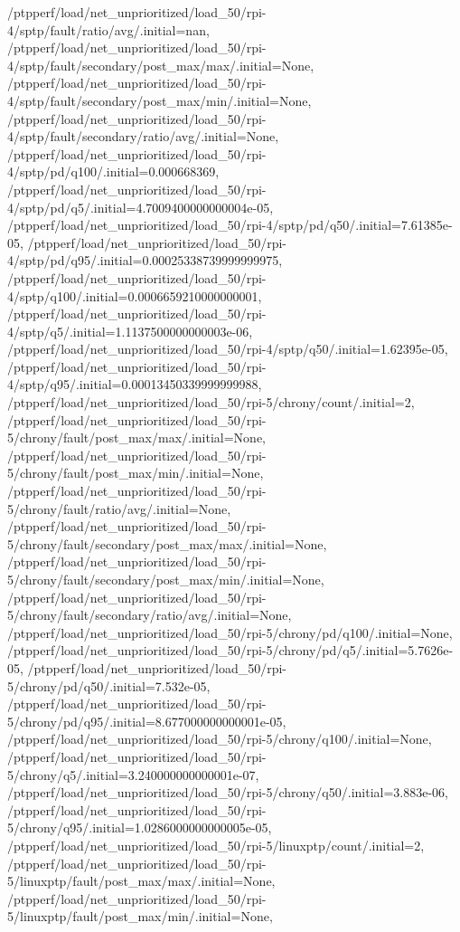 {    /ptpperf/load/net_unprioritized/load_50/rpi-4/sptp/fault/ratio/avg/.initial=nan,
    /ptpperf/load/net_unprioritized/load_50/rpi-4/sptp/fault/secondary/post_max/max/.initial=None,
    /ptpperf/load/net_unprioritized/load_50/rpi-4/sptp/fault/secondary/post_max/min/.initial=None,
    /ptpperf/load/net_unprioritized/load_50/rpi-4/sptp/fault/secondary/ratio/avg/.initial=None,
    /ptpperf/load/net_unprioritized/load_50/rpi-4/sptp/pd/q100/.initial=0.000668369,
    /ptpperf/load/net_unprioritized/load_50/rpi-4/sptp/pd/q5/.initial=4.7009400000000004e-05,
    /ptpperf/load/net_unprioritized/load_50/rpi-4/sptp/pd/q50/.initial=7.61385e-05,
    /ptpperf/load/net_unprioritized/load_50/rpi-4/sptp/pd/q95/.initial=0.00025338739999999975,
    /ptpperf/load/net_unprioritized/load_50/rpi-4/sptp/q100/.initial=0.0006659210000000001,
    /ptpperf/load/net_unprioritized/load_50/rpi-4/sptp/q5/.initial=1.1137500000000003e-06,
    /ptpperf/load/net_unprioritized/load_50/rpi-4/sptp/q50/.initial=1.62395e-05,
    /ptpperf/load/net_unprioritized/load_50/rpi-4/sptp/q95/.initial=0.00013450339999999988,
    /ptpperf/load/net_unprioritized/load_50/rpi-5/chrony/count/.initial=2,
    /ptpperf/load/net_unprioritized/load_50/rpi-5/chrony/fault/post_max/max/.initial=None,
    /ptpperf/load/net_unprioritized/load_50/rpi-5/chrony/fault/post_max/min/.initial=None,
    /ptpperf/load/net_unprioritized/load_50/rpi-5/chrony/fault/ratio/avg/.initial=None,
    /ptpperf/load/net_unprioritized/load_50/rpi-5/chrony/fault/secondary/post_max/max/.initial=None,
    /ptpperf/load/net_unprioritized/load_50/rpi-5/chrony/fault/secondary/post_max/min/.initial=None,
    /ptpperf/load/net_unprioritized/load_50/rpi-5/chrony/fault/secondary/ratio/avg/.initial=None,
    /ptpperf/load/net_unprioritized/load_50/rpi-5/chrony/pd/q100/.initial=None,
    /ptpperf/load/net_unprioritized/load_50/rpi-5/chrony/pd/q5/.initial=5.7626e-05,
    /ptpperf/load/net_unprioritized/load_50/rpi-5/chrony/pd/q50/.initial=7.532e-05,
    /ptpperf/load/net_unprioritized/load_50/rpi-5/chrony/pd/q95/.initial=8.677000000000001e-05,
    /ptpperf/load/net_unprioritized/load_50/rpi-5/chrony/q100/.initial=None,
    /ptpperf/load/net_unprioritized/load_50/rpi-5/chrony/q5/.initial=3.240000000000001e-07,
    /ptpperf/load/net_unprioritized/load_50/rpi-5/chrony/q50/.initial=3.883e-06,
    /ptpperf/load/net_unprioritized/load_50/rpi-5/chrony/q95/.initial=1.0286000000000005e-05,
    /ptpperf/load/net_unprioritized/load_50/rpi-5/linuxptp/count/.initial=2,
    /ptpperf/load/net_unprioritized/load_50/rpi-5/linuxptp/fault/post_max/max/.initial=None,
    /ptpperf/load/net_unprioritized/load_50/rpi-5/linuxptp/fault/post_max/min/.initial=None,
}
